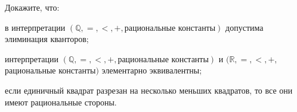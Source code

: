 Докажите, что:
\begin{enumcyr}
    \item в интерпретации $(\mathbb{Q}, =, <, +, \text{рациональные константы})$ допустима элиминация
        кванторов;
    \item интерпретации $(\mathbb{Q}, =, <, +, \text{рациональные константы})$ и $(\mathbb{R}, =, <, +,$
        рациональные константы$)$ элементарно эквивалентны;
    \item если единичный квадрат разрезан на несколько меньших квадратов, то все они имеют рациональные
        стороны.
\end{enumcyr}